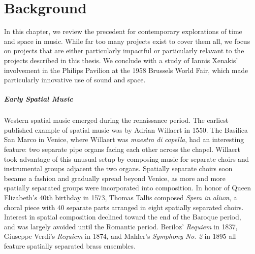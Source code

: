 \clearpage
\chapter{Background}
\label{ch:background}
In this chapter, we review the precedent for contemporary explorations
of time and space in music. While far too many projects exist to cover
them all, we focus on projects that are either particularly impactful or
particularly relavant to the projects described in this thesis. We
conclude with a study of Iannis Xenakis' involvement in the
Philips Pavilion at the 1958 Brussels World Fair, which made
particularly innovative use of sound and space.

\paragraph{Early Spatial Music} Western spatial music emerged during
the renaissance period. The earliest published example of spatial
music was by Adrian Willaert in 1550.\cite{Zvonar1999} The Basilica
San Marco in Venice, where Willaert was \textit{maestro di capella},
had an interesting feature: two separate pipe organs facing each other
across the chapel. Willaert took advantage of this unusual setup by composing
music for separate choirs and instrumental groups adjacent the two
organs. Spatially separate choirs soon became a fashion and gradually
spread beyond Venice, as more and more spatially separated groups were
incorporated into composition. In honor of Queen Elizabeth's 40th
birthday in 1573, Thomas Tallis composed \textit{Spem in alium}, a
choral piece with 40 separate parts arranged in eight spatially
separated choirs. Interest in spatial composition declined
toward the end of the Baroque period, and was largely avoided until
the Romantic period. Beriloz' \textit{Requiem} in 1837, Giuseppe
Verdi's \textit{Requiem} in 1874, and Mahler's \textit{Symphony No. 2}
in 1895 all feature spatially separated brass ensembles.

